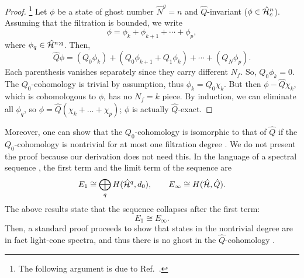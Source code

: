 \documentclass[a4paper,12pt]{article}
\newcommand{\hN}{\hat{N}^g}
\newcommand{\hQ}{\hat{Q}}
\begin{document}
\begin{proof}
\footnote{The following argument is due to Ref.~\cite{BMP}.}
Let $ \phi $ be a state of ghost number $ \hN =n$ and $\hQ$-invariant
($\phi\in \hat{\cal H}^n_c$).
Assuming that the filtration is bounded, we write
\begin{equation}
%
\phi = \phi_{k} + \phi_{k+1} + \cdots + \phi_{p},
%
\end{equation}
where $\phi_q\in \hat{\cal H}^{n;q}$.
Then,
\begin{equation}
%
\hQ \phi = (Q_{0} \phi_{k}) + (Q_{0} \phi_{k+1} + Q_{1} \phi_{k})
+  \cdots + (Q_N\phi_p).
%
\end{equation}
Each parenthesis vanishes separately since they carry different $ N_{f} $.
So, $ Q_{0} \phi_{k} =0 $.  The $ Q_{0} $-cohomology is trivial by
assumption, thus $ \phi_{k} = Q_{0} \chi_{k} $.
But then $ \phi
- \hQ \chi_{k} $, which is cohomologous to $ \phi $, has no $ N_{f} = k $
piece. By induction, we can eliminate all $ \phi_q $, so $ \phi = \hQ (
\chi_{k} + \ldots + \chi_{p} ) $; $ \phi $ is actually $\hQ$-exact.
\end{proof}

Moreover, one can show that the $Q_{0}$-cohomology is isomorphic to that of
$\hQ$ if the $Q_{0}$-cohomology is nontrivial for at most one filtration degree
\cite{Big,BMP}. We do not present the proof because our derivation does not
need this.
In the language of a spectral sequence \cite{BT}, the first term and the
limit term of the sequence are
\begin{equation}
%
E_1 \cong \bigoplus_q H(\hat{\cal H}^q, d_0), \qquad E_\infty \cong
H(\hat{\cal H}, \hQ).
%
\end{equation}
The above results state that the sequence collapses after the first term:
\begin{equation}
%
E_1 \cong E_\infty.
%
\end{equation}
Then, a standard proof proceeds to show that states in the nontrivial degree are in fact light-cone spectra, and thus there is no ghost in the $\hQ$-cohomology \cite{Big}.
\end{document}
